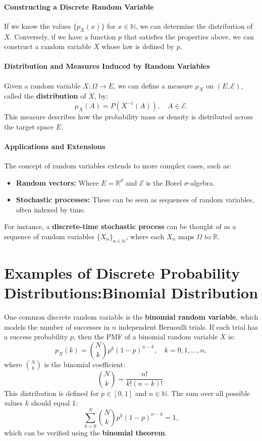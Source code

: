     \paragraph{Constructing a Discrete Random Variable}
    If we know the values \( \{p_X(x)\} \) for \( x \in \mathbb{N} \), we can determine the distribution of \( X \). Conversely, if we have a function \( p \) that satisfies the properties above, we can construct a random variable \( X \) whose law is defined by \( p \).
    
    \paragraph{Distribution and Measures Induced by Random Variables}
    Given a random variable \( X: \Omega \to E \), we can define a measure \( \mu_X \) on \( (E, \mathcal{E}) \), called the \textbf{distribution} of \( X \), by:
    \[
    \mu_X(A) = P(X^{-1}(A)), \quad A \in \mathcal{E}.
    \]
    This measure describes how the probability mass or density is distributed across the target space \( E \). 

    \paragraph{Applications and Extensions}
    The concept of random variables extends to more complex cases, such as:
    \begin{itemize}
        \item \textbf{Random vectors:} Where \( E = \mathbb{R}^d \) and \( \mathcal{E} \) is the Borel $\sigma$-algebra.
        \item \textbf{Stochastic processes:} These can be seen as sequences of random variables, often indexed by time.
    \end{itemize}
    For instance, a \textbf{discrete-time stochastic process} can be thought of as a sequence of random variables \( \{X_n\}_{n \in \mathbb{N}} \), where each \( X_n \) maps \( \Omega \) to \( \mathbb{R} \).
    
    \section{Examples of Discrete Probability Distributions:Binomial Distribution}
    One common discrete random variable is the \textbf{binomial random variable}, which models the number of successes in \( n \) independent Bernoulli trials. If each trial has a success probability \( p \), then the PMF of a binomial random variable \( X \) is:
    \[
    p_X(k) = \binom{{N}}{k} p^k (1-p)^{n-k}, \quad k = 0, 1, \ldots, n,
    \]
    where \( \binom{{N}}{k} \) is the binomial coefficient:
    \[
    \binom{{N}}{k} = \frac{n!}{k!(n-k)!}.
    \]
    This distribution is defined for \( p \in [0, 1] \) and \( n \in \mathbb{N} \). The sum over all possible values \( k \) should equal 1:
    \[
    \sum_{k=0}^{N} \binom{{N}}{k} p^k (1-p)^{n-k} = 1,
    \]
    which can be verified using the \textbf{binomial theorem}.
    

